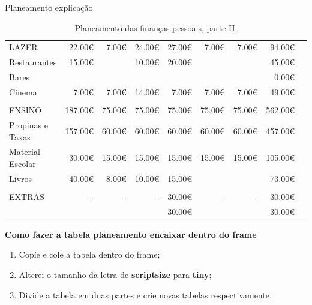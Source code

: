 \documentclass[11pt]{beamer}
\begin{document}
\begin{frame}[ allowframebreaks ]{Planeamento explicação}
		\begin{table}[!htp]\centering
			\tiny
			\begin{tabular}{lrrrrrrrr}\toprule
				\cellcolor[HTML]{4285f4}LAZER &\cellcolor[HTML]{4285f4}22.00€ &\cellcolor[HTML]{4285f4}7.00€ &\cellcolor[HTML]{4285f4}24.00€ &\cellcolor[HTML]{4285f4}27.00€ &\cellcolor[HTML]{4285f4}7.00€ &\cellcolor[HTML]{4285f4}7.00€ &\cellcolor[HTML]{4285f4}94.00€ \\
				Restaurantes &15.00€ & &10.00€ &20.00€ & & &\cellcolor[HTML]{4285f4}45.00€ \\
				Bares & & & & & & &\cellcolor[HTML]{4285f4}0.00€ \\
				Cinema &7.00€ &7.00€ &14.00€ &7.00€ &7.00€ &7.00€ &\cellcolor[HTML]{4285f4}49.00€ \\
				& & & & & & & \\
				\cellcolor[HTML]{4285f4}ENSINO &\cellcolor[HTML]{4285f4}187.00€ &\cellcolor[HTML]{4285f4}75.00€ &\cellcolor[HTML]{4285f4}75.00€ &\cellcolor[HTML]{4285f4}75.00€ &\cellcolor[HTML]{4285f4}75.00€ &\cellcolor[HTML]{4285f4}75.00€ &\cellcolor[HTML]{4285f4}562.00€ \\
				Propinas e Taxas &157.00€ &60.00€ &60.00€ &60.00€ &60.00€ &60.00€ &\cellcolor[HTML]{4285f4}457.00€ \\
				Material Escolar &30.00€ &15.00€ &15.00€ &15.00€ &15.00€ &15.00€ &\cellcolor[HTML]{4285f4}105.00€ \\
				Livros &40.00€ &8.00€ &10.00€ &15.00€ & & &\cellcolor[HTML]{4285f4}73.00€ \\
				& & & & & & & \\
				\cellcolor[HTML]{4285f4}EXTRAS &\cellcolor[HTML]{4285f4}- &\cellcolor[HTML]{4285f4}- &\cellcolor[HTML]{4285f4}- &\cellcolor[HTML]{4285f4}30.00€ &\cellcolor[HTML]{4285f4}- &\cellcolor[HTML]{4285f4}- &\cellcolor[HTML]{4285f4}30.00€ \\
				& & & &30.00€ & & &\cellcolor[HTML]{4285f4}30.00€ \\
			\end{tabular}
			\caption{Planeamento das finanças pessoais, parte II.}\label{tab:planeamento2 }
		\end{table}

		\allowbreak{}
		
		\large{
			\textbf{Como fazer a tabela planeamento encaixar dentro do frame}
		}
		\begin{enumerate}
			\normalsize
			\item Copíe e cole a tabela dentro do frame;
			\item Alterei o tamanho da letra de \textbf{scriptsize} para \textbf{tiny};
			\item Divide a tabela em duas partes e crie novas tabelas respectivamente.
		\end{enumerate}
	\end{frame}
\end{document}
